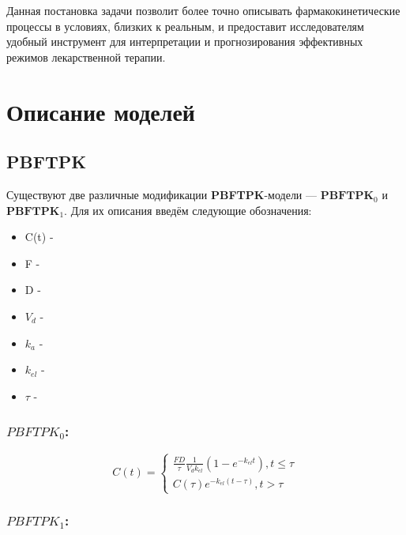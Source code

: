 \documentclass[12pt]{article}
\begin{document}
Данная постановка задачи позволит более точно описывать фармакокинетические процессы в условиях, близких к реальным, и предоставит исследователям удобный инструмент для интерпретации и прогнозирования эффективных режимов лекарственной терапии.


\newpage

\section{Описание моделей}

\subsection{PBFTPK}

Существуют две различные модификации \textbf{PBFTPK}-модели --- $\textbf{PBFTPK}_0$ и $\textbf{PBFTPK}_1$. Для их описания введём следующие обозначения:

\begin{itemize}
	\item C(t) - 
	\item F - 
	\item D - 
	\item $V_d$ - 
	\item $k_a$ - 
	\item $k_{el}$ - 
	\item $\tau$ - 
\end{itemize}

\subsubsection*{$PBFTPK_0$:}

\[
	C(t) = \begin{cases}
		\frac{FD}{\tau} \frac{1}{V_d k_{el}} (1 - e^{-k_{el} t}), t \leq \tau \\
		C(\tau) e^{-k_{el}(t - \tau)}, t > \tau
	\end{cases}
\]

\subsubsection*{$PBFTPK_1$:}
\end{document}

